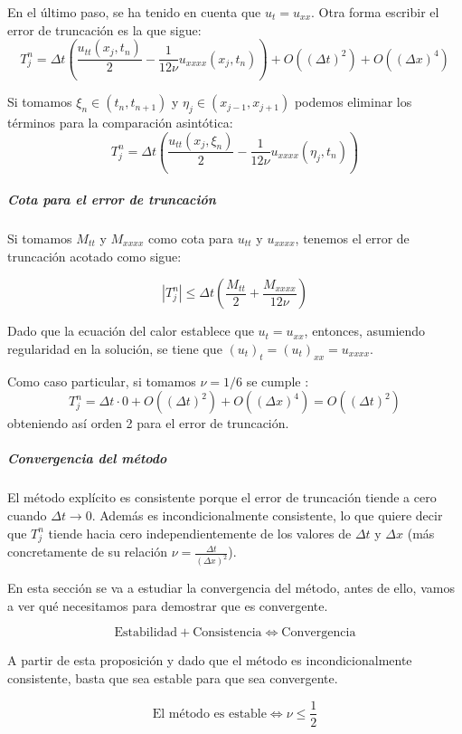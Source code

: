 En el último paso, se ha tenido en cuenta que $u_t = u_{xx}$. Otra forma escribir el error de truncación es la que sigue:
$$T_j^n = \Delta t \left(\frac{u_{tt}(x_j,t_n)}{2}- \frac{1}{12\nu} u_{xxxx}(x_j,t_n)\right) + O\left((\Delta t)^2\right) + O\left((\Delta x)^4\right)$$

Si tomamos $\xi_n \in (t_n,t_{n+1})$ y $\eta_j \in (x_{j-1}, x_{j+1})$ podemos eliminar los términos para la comparación asintótica:
$$T_j^n = \Delta t \left(\frac{u_{tt}(x_j,\xi_n)}{2}- \frac{1}{12\nu} u_{xxxx}(\eta_j,t_n)\right)$$

\subparagraph{Cota para el error de truncación}\mbox{}

Si tomamos $M_{tt}$ y $M_{xxxx}$ como cota para $u_{tt}$ y $u_{xxxx}$, tenemos el error de truncación acotado como sigue:

$$|T_j^n| \le \Delta t \left(\frac{M_{tt}}{2} + \frac{M_{xxxx}}{12{\nu}}\right)$$

Dado que la ecuación del calor establece que $u_{t} = u_{xx}$, entonces, asumiendo regularidad en la solución, se tiene que $(u_t)_{t} = (u_{t})_{xx} = u_{xxxx}$. 

Como caso particular, si tomamos $\nu = 1/6$ se cumple :
$$T_j^n = \Delta t\cdot 0 + O\left((\Delta t)^2\right) + O\left((\Delta x)^4\right) = O\left((\Delta t)^2\right)$$
obteniendo así orden 2 para el error de truncación.

\subparagraph{Convergencia del método}\mbox{}

El método explícito es consistente porque el error de truncación tiende a cero cuando $\Delta t \to 0$.
Además es incondicionalmente consistente, lo que quiere decir que $T_j^n$ tiende hacia cero independientemente de los valores de $\Delta t$ y $\Delta x$ (más concretamente de su relación $\nu = \frac{\Delta t}{(\Delta x)^2}$).

En esta sección se va a estudiar la convergencia del método, antes de ello, vamos a ver qué necesitamos para demostrar que es convergente.

\begin{prop}
	$$\text{Estabilidad} + \text{Consistencia} \iff \text{Convergencia}$$
\end{prop} 

A partir de esta proposición y dado que el método es incondicionalmente consistente, basta que sea estable para que sea convergente.

\begin{prop}
$$\text{El método es estable} \iff \nu \le \frac{1}{2}$$
\end{prop}


